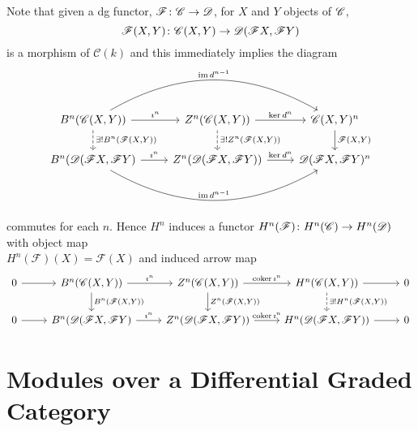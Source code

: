 \documentclass[dissertation.tex]{subfiles}
\begin{document}
        \begin{rmk}\label{DGInducedHomology}
          Note that given a dg functor, $\mathscr{F} \colon \mathscr{C} \rightarrow \mathscr{D}$, for $X$ and $Y$ objects of $\mathscr{C}$, 
          $$\mathscr{F}(X,Y) \colon \mathscr{C}(X,Y) \rightarrow \mathscr{D}(\mathscr{F}X, \mathscr{F}Y)$$
          is a morphism of $\mathcal{C}(k)$ and this immediately implies the diagram
          $$\begin{tikzcd}
            B^n(\CC(X,Y))\arrow{r}{\imath^n}\arrow[bend left]{rr}{\im d^{n-1}}\arrow[dashed]{d}{\exists !B^n(\F(X,Y))} & Z^n(\CC(X,Y)) \arrow{r}{\ker d^n}\arrow[dashed]{d}{\exists !Z^n(\F(X,Y))} & \CC(X,Y)^{n} \arrow{d}{\F(X,Y)}\\
            B^n(\D(\F X,\F Y) \arrow{r}{\imath^n}\arrow[bend right]{rr}{\im d^{n-1}} & Z^n(\D(\F X,\F Y))\arrow{r}{\ker d^n} & \D(\F X,\F Y)^{n}
          \end{tikzcd}$$
          commutes for each $n$.
          Hence $H^n$ induces a functor
          $H^n(\mathscr{F}) \colon H^n(\mathscr{C}) \rightarrow H^n(\mathscr{D})$
          with object map\\ $H^n(\mathscr{F})(X) = \mathscr{F}(X)$ and induced arrow map 
          $$\begin{tikzcd}
            0 \arrow{r} & B^n(\CC(X,Y))\arrow{r}{\imath^n}\arrow{d}{B^n(\F(X,Y))} & Z^n(\CC(X,Y)) \arrow{r}{\coker \imath^n}\arrow{d}{Z^n(\F(X,Y))} & H^n(\CC(X,Y)) \arrow[dashed]{d}{\exists !H^n(\F(X,Y))}\arrow{r} & 0 \\
            0 \arrow{r} & B^n(\D(\F X,\F Y) \arrow{r}{\imath^n} & Z^n(\D(\F X,\F Y))\arrow{r}{\coker \imath^n} & H^n(\D(\F X,\F Y)) \arrow{r} & 0
          \end{tikzcd}$$
        \end{rmk}

        \section{Modules over a Differential Graded Category}
\end{document}
